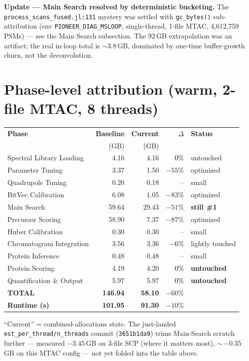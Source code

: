 \documentclass[11pt]{article}
\newcommand{\code}[1]{\texttt{\small #1}}
\begin{document}
\textbf{Update --- Main Search resolved by deterministic bucketing.} The
\code{process\_scans\_fused.jl:131} mystery was settled with \code{gc\_bytes()}
sub-attribution (env \code{PIONEER\_DIAG\_MSLOOP}, single-thread, 1-file MTAC,
4{,}612{,}759 PSMs) --- see the Main Search subsection. The 92\,GB extrapolation
was an artifact; the real in-loop total is $\sim$3.8\,GB, dominated by one-time
buffer-growth churn, not the deconvolution.

\section{Phase-level attribution (warm, 2-file MTAC, 8 threads)}
\begin{center}
\begin{tabular}{lrrrl}
\toprule
\textbf{Phase} & \textbf{Baseline} & \textbf{Current} & \textbf{$\Delta$} & \textbf{Status} \\
 & (GB) & (GB) & & \\
\midrule
Spectral Library Loading      & 4.16  & 4.16  & \textcolor{black}{0\%}    & untouched \\
Parameter Tuning              & 3.37  & 1.50  & \textcolor{hi}{$-55\%$}   & optimized \\
Quadrupole Tuning             & 0.20  & 0.18  & --                        & small \\
BitVec Calibration            & 6.08  & 1.05  & \textcolor{hi}{$-83\%$}   & optimized \\
Main Search                   & 59.64 & 29.43 & \textcolor{hi}{$-51\%$}   & \textbf{still \#1} \\
Precursor Scoring             & 58.90 & 7.37  & \textcolor{hi}{$-87\%$}   & optimized \\
Huber Calibration             & 0.30  & 0.30  & --                        & small \\
Chromatogram Integration      & 3.56  & 3.36  & \textcolor{black}{$-6\%$} & lightly touched \\
Protein Inference             & 0.48  & 0.48  & --                        & small \\
Protein Scoring               & 4.19  & 4.20  & \textcolor{black}{0\%}    & \textbf{untouched} \\
Quantification \& Output      & 5.97  & 5.97  & \textcolor{black}{0\%}    & \textbf{untouched} \\
\midrule
\textbf{TOTAL}                & \textbf{146.94} & \textbf{58.10} & \textcolor{hi}{\textbf{$-60\%$}} & \\
\textbf{Runtime (s)}          & \textbf{101.95} & \textbf{91.30}  & \textcolor{hi}{\textbf{$-10\%$}} & \\
\bottomrule
\end{tabular}
\end{center}
\noindent\footnotesize ``Current'' = combined-allocations state. The just-landed
\code{est\_per\_thread/n\_threads} commit (\code{3651b1da9}) trims Main-Search
scratch further --- measured $-3.45$\,GB on 3-file SCP (where it matters most),
$\sim$\,$-0.35$\,GB on this MTAC config --- not yet folded into the table above.
\normalsize
\end{document}
